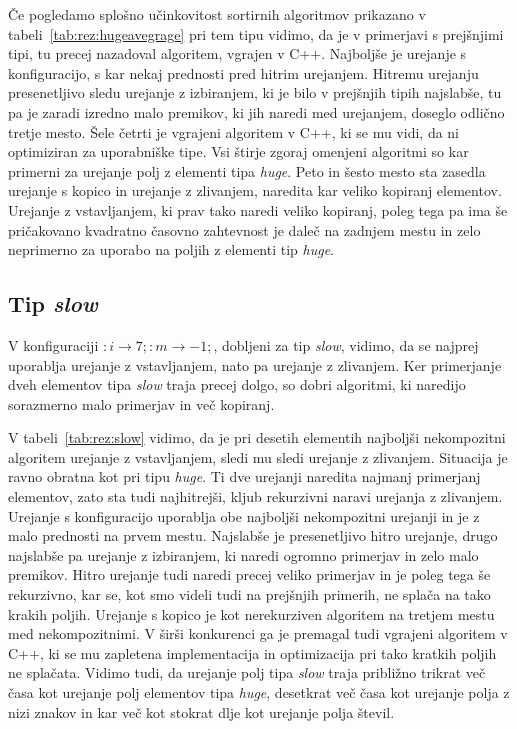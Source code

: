 \documentclass[a4paper,oneside,12pt]{article}
\newcommand{\lra}{\ensuremath{\longrightarrow}}
\begin{document}
Če pogledamo splošno učinkovitost sortirnih algoritmov prikazano v
tabeli~\ref{tab:rez:hugeavegrage} pri tem tipu vidimo, da
je v primerjavi s prejšnjimi tipi, tu precej nazadoval algoritem, vgrajen v C++.
Najboljše je urejanje s konfiguracijo, s kar nekaj prednosti pred hitrim
urejanjem. Hitremu urejanju presenetljivo sledu urejanje z izbiranjem, ki je
bilo v prejšnjih tipih najslabše, tu pa je zaradi izredno malo premikov, ki jih
naredi med urejanjem, doseglo odlično tretje mesto. Šele četrti je vgrajeni
algoritem v C++, ki se mu vidi, da ni optimiziran za uporabniške tipe. Vsi
štirje zgoraj omenjeni algoritmi so kar primerni za urejanje polj z elementi
tipa \emph{huge}. Peto in šesto mesto sta zasedla urejanje s kopico in urejanje
z zlivanjem, naredita kar veliko kopiranj elementov. Urejanje z vstavljanjem, ki
prav tako naredi veliko kopiranj, poleg tega pa ima še pričakovano kvadratno časovno
zahtevnost je daleč na zadnjem mestu in zelo neprimerno za uporabo na poljih z
elementi tip \emph{huge}. 

\subsection{Tip \emph{slow}}
V konfiguraciji
$:i \lra 7;:m \lra -1;$, dobljeni za tip \emph{slow}, 
vidimo, da se najprej uporablja urejanje z vstavljanjem, nato pa
urejanje z zlivanjem. Ker primerjanje dveh elementov tipa \emph{slow} traja precej dolgo, so dobri algoritmi, ki
naredijo sorazmerno malo primerjav in več kopiranj. 

V tabeli~\ref{tab:rez:slow} vidimo, da je pri desetih elementih najboljši nekompozitni algoritem urejanje z
vstavljanjem, sledi mu sledi urejanje z zlivanjem. Situacija je ravno
obratna kot pri tipu \emph{huge}. Ti dve urejanji naredita najmanj primerjanj
elementov, zato sta tudi najhitrejši, kljub rekurzivni naravi urejanja z
zlivanjem. Urejanje s konfiguracijo uporablja obe
najboljši nekompozitni urejanji in je z malo prednosti na prvem mestu. Najslabše
je presenetljivo hitro urejanje, drugo najslabše pa urejanje z izbiranjem, ki
naredi ogromno primerjav in zelo malo premikov. Hitro urejanje tudi naredi
precej veliko primerjav in je poleg tega še rekurzivno, kar se, kot smo videli tudi
na prejšnjih primerih, ne splača na tako krakih poljih. Urejanje s kopico je kot
nerekurziven algoritem na tretjem mestu med nekompozitnimi. V širši
konkurenci ga je premagal tudi vgrajeni algoritem v C++, ki se mu zapletena
implementacija in optimizacija pri tako kratkih poljih ne splačata.
Vidimo tudi, da urejanje polj tipa \emph{slow} traja približno trikrat več časa kot
urejanje polj elementov tipa \emph{huge}, desetkrat več časa kot urejanje polja
z nizi znakov in kar več kot stokrat dlje kot urejanje polja števil.
\end{document}
